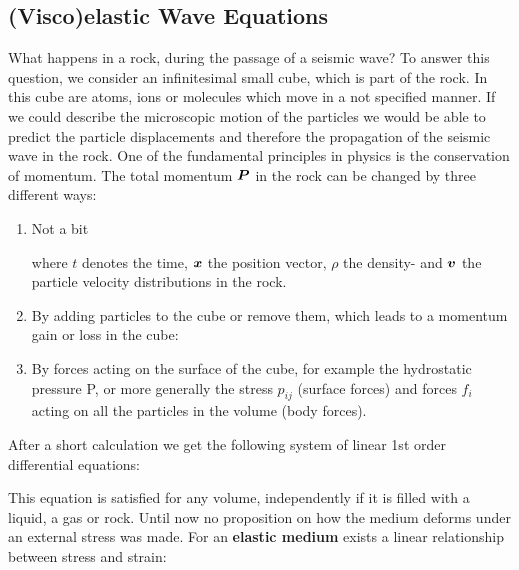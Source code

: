 \documentclass[11pt,onecolumn,oneside]{article}
\begin{document}
\subsection{(Visco)elastic Wave Equations}
What happens in a rock, during the passage of a seismic wave? To answer this question, we consider an infinitesimal small cube, which is part of the rock. In this cube are atoms, ions or molecules which move in a not specified manner. If we could describe the microscopic motion of the particles we would be able to predict the particle displacements and therefore the propagation of the seismic wave in the rock. One of the fundamental principles in physics is the conservation of momentum. The total momentum $\MB{P}$ in the rock can be changed by three different ways:
\begin{enumerate}

\item Not a bit

where $t$ denotes the time, $\MB{x}$ the position vector, $\rho$ the density- and $\MB{v}$ the particle velocity distributions in the rock. 

\item By adding particles to the cube or remove them, which leads to a momentum gain or loss in the cube:


\item By forces acting on the surface of the cube, for example the hydrostatic pressure P, or  more generally the stress $p_{ij}$ (surface forces) and forces $f_i$ acting on all the particles in the volume (body forces). 
\end{enumerate}

After a short calculation we get the following system of linear 1st order differential equations: 


This equation is satisfied for any volume, independently if it is filled with a liquid, a gas or rock. Until now no proposition on how the medium deforms under an external stress was made. For an {\bf{elastic medium}} exists a linear relationship between stress and strain:

\end{document}
